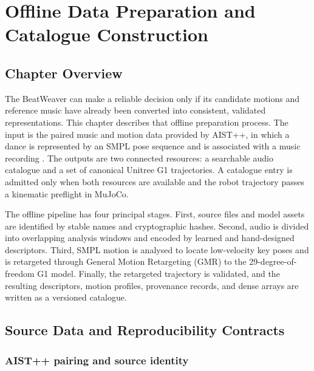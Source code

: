 
\chapter{Offline Data Preparation and Catalogue Construction}
\label{chap:offline_catalogue}

\section{Chapter Overview}
\label{sec:offline_overview}

The BeatWeaver can make a reliable decision only if its candidate
motions and reference music have already been converted into consistent,
validated representations. This chapter describes that offline preparation
process. The input is the paired music and motion data provided by AIST++, in
which a dance is represented by an SMPL pose sequence and is associated with a
music recording \cite{li2021ai,loper2023smpl}. The outputs are two connected
resources: a searchable audio catalogue and a set of canonical Unitree G1
trajectories. A catalogue entry is admitted only when both resources are
available and the robot trajectory passes a kinematic preflight in MuJoCo.

The offline pipeline has four principal stages. First, source files and model
assets are identified by stable names and cryptographic hashes. Second, audio
is divided into overlapping analysis windows and encoded by learned and
hand-designed descriptors. Third, SMPL motion is analysed to locate low-velocity
key poses and is retargeted through General Motion Retargeting (GMR) to the
29-degree-of-freedom G1 model. Finally, the retargeted trajectory is validated,
and the resulting descriptors, motion profiles, provenance records, and dense
arrays are written as a versioned catalogue.

\section{Source Data and Reproducibility Contracts}
\label{sec:offline_sources}

\subsection{AIST++ pairing and source identity}
\label{subsec:aist_pairing}

